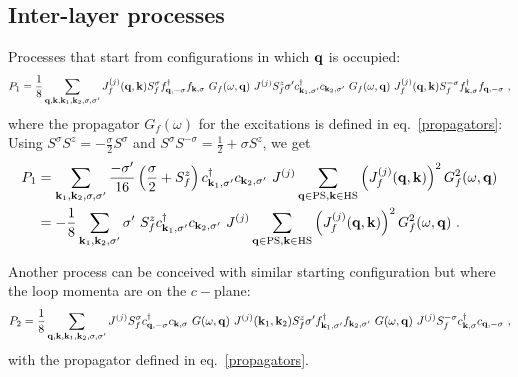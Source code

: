 \documentclass[%
reprint,
superscriptaddress,
groupedaddress,
superscriptaddress,
onecolumn,
]{revtex4-2}
\begin{document}
\subsection{Inter-layer processes}
Processes that start from configurations in which \({\bf q}\) is occupied:
\begin{equation}\begin{aligned}
	P_1 = \frac{1}{8}\sum_{{\bf q},{\bf k},{\bf k}_1, {\bf k}_2,\sigma,\sigma^\prime} J_f^{(j)}({\bf q},{\bf k}) S_f^\sigma f^\dagger_{{\bf q},-\sigma}f_{{\bf k},\sigma} ~ G_f(\omega, {\bf q}) ~ J^{(j)} S_f^z \sigma^\prime c^\dagger_{{\bf k}_1,\sigma^\prime}c_{{\bf k}_2,\sigma^\prime} ~ G_f(\omega, {\bf q}) ~ J_f^{(j)}({\bf q},{\bf k}) S_f^{-\sigma} f^\dagger_{{\bf k},\sigma}f_{{\bf q},-\sigma}~,
\end{aligned}\end{equation}
where the propagator \(G_f(\omega)\) for the excitations is defined in eq.~\ref{propagators}:
Using \(S^\sigma S^z = -\frac{\sigma}{2}S^\sigma\) and \(S^\sigma S^{-\sigma} = \frac{1}{2} + \sigma S^z\), we get
\begin{equation}\begin{aligned}
	P_1 &= \sum_{{\bf k}_1, {\bf k}_2,\sigma,\sigma^\prime} \frac{-\sigma^\prime}{16} \left(\frac{\sigma}{2} + S_f^z\right) c^\dagger_{{\bf k}_1,\sigma^\prime}c_{{\bf k}_2,\sigma^\prime} ~  J^{(j)} \sum_{{\bf q} \in \text{PS} ,{\bf k} \in \text{HS}}\left(J_f^{(j)}({\bf q},{\bf k})\right)^2 G_f^2(\omega, {\bf q})\\
		&= -\frac{1}{8}\sum_{{\bf k}_1, {\bf k}_2,\sigma^\prime} \sigma^\prime~S_f^z c^\dagger_{{\bf k}_1,\sigma^\prime}c_{{\bf k}_2,\sigma^\prime} ~  J^{(j)} \sum_{{\bf q} \in \text{PS} ,{\bf k} \in \text{HS}}\left(J_f^{(j)}({\bf q},{\bf k})\right)^2 G^2_f(\omega, {\bf q})~.
\end{aligned}\end{equation}

Another process can be conceived with similar starting configuration but where the loop momenta are on the \(c-\)plane:
\begin{equation}\begin{aligned}
	P_2 = \frac{1}{8}\sum_{{\bf q},{\bf k},{\bf k}_1, {\bf k}_2,\sigma,\sigma^\prime} J^{(j)} S_f^\sigma c^\dagger_{{\bf q},-\sigma}c_{{\bf k},\sigma} ~ G(\omega, {\bf q}) ~ J^{(j)}({\bf k}_1,{\bf k}_2) S_f^z \sigma^\prime f^\dagger_{{\bf k}_1,\sigma^\prime}f_{{\bf k}_2,\sigma^\prime} ~ G(\omega, {\bf q}) ~ J^{(j)} S_f^{-\sigma} c^\dagger_{{\bf k},\sigma}c_{{\bf q},-\sigma}~,
\end{aligned}\end{equation}
with the propagator defined in eq.~\ref{propagators}.
\end{document}
